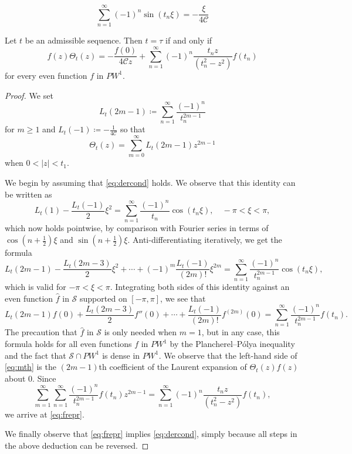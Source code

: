 \documentclass[10pt,a4paper]{amsart}
\newcommand{\Cone}{\mathscr{C}}
\begin{document}
\begin{equation}  \sum_{n=1}^\infty  (-1)^{n}\sin (t_n \xi) = - \frac{\xi}{4\Cone}  \label{eq:dercond}  \end{equation}

\begin{lemma} \label{lem:frep} Let $t$ be an admissible sequence. Then $t=\tau$ if and only if
\begin{equation} \label{eq:frepr} f(z) \Theta_t(z) =- \frac{f(0)}{4\Cone z} + \sum_{n=1}^{\infty} (-1)^n \frac{t_n z}{(t_n^2-z^2)} f(t_n)\end{equation}
for every even function $f$ in $PW^1$.
\end{lemma}

\begin{proof}
We set
\[ L_t (2m-1)\coloneqq \sum_{n=1}^\infty \frac{(-1)^n}{t_n^{2m-1}} \]
for $m\ge 1$ and $L_t(-1)\coloneqq -\frac{1}{4\Cone}$ so that
\[ \Theta_t(z)=\sum_{m=0}^\infty L_t(2m-1) z^{2m-1} \]
when $0<|z|<t_1$.

We begin by assuming that \eqref{eq:dercond} holds. We observe that this identity can be written as
\[ L_t(1)-\frac{L_t(-1)}{2}\xi^2 =\sum_{n=1}^\infty \frac{(-1)^n}{t_n} \cos (t_n \xi), \quad -\pi < \xi < \pi ,\]
which now holds pointwise, by comparison with Fourier series in terms of $\cos(n+\frac12)\xi $  and $\sin(n+\frac12)\xi$.
Anti-differentiating iteratively, we get the formula
\[ L_t(2m-1)-\frac{L_t(2m-3)}{2}\xi^2 + \cdots + (-1)^m \frac{L_t(-1)}{(2m)!} \xi^{2m} = \sum_{n=1}^\infty \frac{(-1)^n}{t_n^{2m-1}} \cos (t_n \xi),  \]
which is valid for $-\pi<\xi <\pi$.
Integrating both sides of this identity against an even function $\widehat{f}$ in $\mathcal{S}$ supported on $[-\pi,\pi]$, we see that
\begin{equation} \label{eq:mth} L_t(2m-1)f(0)+\frac{L_t(2m-3)}{2}f''(0) + \cdots + \frac{L_t(-1)}{(2m)!} f^{(2m)}(0) = \sum_{n=1}^\infty \frac{(-1)^n}{t_n^{2m-1}} f(t_n). \end{equation}
The precaution that $\widehat{f}$ in $\mathcal{S}$ is only needed when $m=1$, but in any case,  this formula holds for all even functions $f$ in $PW^1$ by the Plancherel--P\'{o}lya inequality and the fact that $\mathcal{S}\cap PW^1$ is dense in $PW^1$.
We observe that the left-hand side of \eqref{eq:mth} is the $(2m-1)$th coefficient of the Laurent expansion of $\Theta_t(z)f(z)$ about $0$. Since
\[ \sum_{m=1}^\infty \sum_{n=1}^\infty \frac{(-1)^n}{t_n^{2m-1}} f(t_n) z^{2m-1} = \sum_{n=1}^{\infty} (-1)^n \frac{t_n z}{(t_n^2-z^2)} f(t_n), \]
we arrive at \eqref{eq:frepr}.

We finally observe that \eqref{eq:frepr} implies \eqref{eq:dercond}, simply because all steps in the above deduction can be reversed.
\end{proof}
\end{document}
